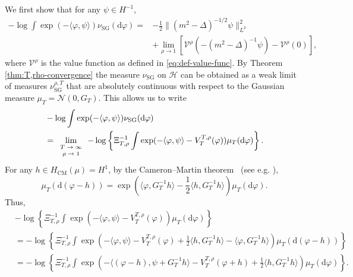 \documentclass[11pt, a4paper]{scrartcl}
\numberwithin{equation}{section}
\theoremstyle{plain}
\theoremstyle{remark}
\newcommand{\mathd}{\mathrm{d}}
\newcommand{\tmop}[1]{\ensuremath{\operatorname{#1}}}
\newcommand{\tmscript}[1]{\text{\scriptsize{$#1$}}}
\newcommand{\tmtextbf}[1]{\text{{\bfseries{#1}}}}
\begin{document}
\tmtextbf{Step 1.} We first show that for any $\psi\in H^{-1}$,
\begin{equation}
  \begin{aligned}
    - \log \int \exp (- \langle \varphi, \psi \rangle) \nu_{\tmop{SG}} (\mathd
    \varphi) = & - \frac{1}{2} \| (m^2 - \Delta)^{-1 / 2} \psi \|_{L^2}^2\\ 
     &+ \lim_{\rho\to 1}
    [\mathcal{V}^{\rho} (- (m^2 - \Delta)^{-1} \psi) - \mathcal{V}^{\rho} (0)],
    \label{eq:MGF-SG}
  \end{aligned}
\end{equation}
where $\mathcal{V}^{\rho}$ is the value function as defined in
\eqref{eq:def-value-func}.  By Theorem \ref{thm:T,rho-convergence} the measure
$\nu_{\tmop{SG}}$ on $\mathcal{H}$ can be obtained as a weak limit of
measures $\nu_{\tmop{SG}}^{\rho, T}$ that are absolutely continuous with
respect to the Gaussian measure $\mu_T = \mathcal{N} (0, G_T)$. This allows us to write
\begin{equation*}
  \begin{aligned}
    &- \log \int \exp (- \langle \varphi, \psi \rangle) \nu_{\tmop{SG}} (\mathd \varphi)\\
    &= \lim_{\tmscript{\begin{array}{c}
      T \rightarrow \infty\\
      \rho \rightarrow 1
    \end{array}}} - \log \left\{ \Xi_{T, \rho}^{- 1} \int \exp (- \langle
    \varphi, \psi \rangle - V_T^{T, \rho} (\varphi)) \mu_T (\mathd \varphi)
    \right\}.
  \end{aligned}
\end{equation*}
For any $h \in H_{\tmop{CM}} (\mu) = H^1$, by the Cameron--Martin theorem \
(see e.g. {\cite[Corollary 2.4.3]{bogachevGaussianMeasures1998}}),
\[ \mu_T (\mathd (\varphi - h)) = \exp \left( \langle \varphi, G_T^{-1} h \rangle -
   \frac{1}{2} \langle h, G_T^{-1} h \rangle \right) \mu_T (\mathd \varphi) . \]
Thus,
\begin{equation*}
  \begin{aligned}
    &-\log \left\{ \Xi_{T, \rho}^{- 1} \int \exp (- \langle \varphi, \psi
   \rangle - V_T^{T, \rho} (\varphi)) \mu_T (\mathd \varphi) \right\}\\
    & = - \log \left\{ \Xi_{T, \rho}^{- 1} \int \exp \left( - \langle \varphi,
    \psi \rangle - V_T^{T, \rho} (\varphi) + \frac{1}{2} \langle h, G_T^{-1}h
    \rangle - \langle \varphi, G_T^{-1}h \rangle \right) \mu_T (\mathd (\varphi -
    h)) \right\}\\
    & = - \log \left\{ \Xi_{T, \rho}^{- 1} \int \exp \left( - \langle (\varphi-h),
    \psi + G_T^{-1}h \rangle - V_T^{T, \rho}
    (\varphi + h) + \frac{1}{2} \langle h, G_T^{-1}h \rangle \right) \mu_T (\mathd
    \varphi) \right\}.
  \end{aligned}
\end{equation*}
\end{document}
